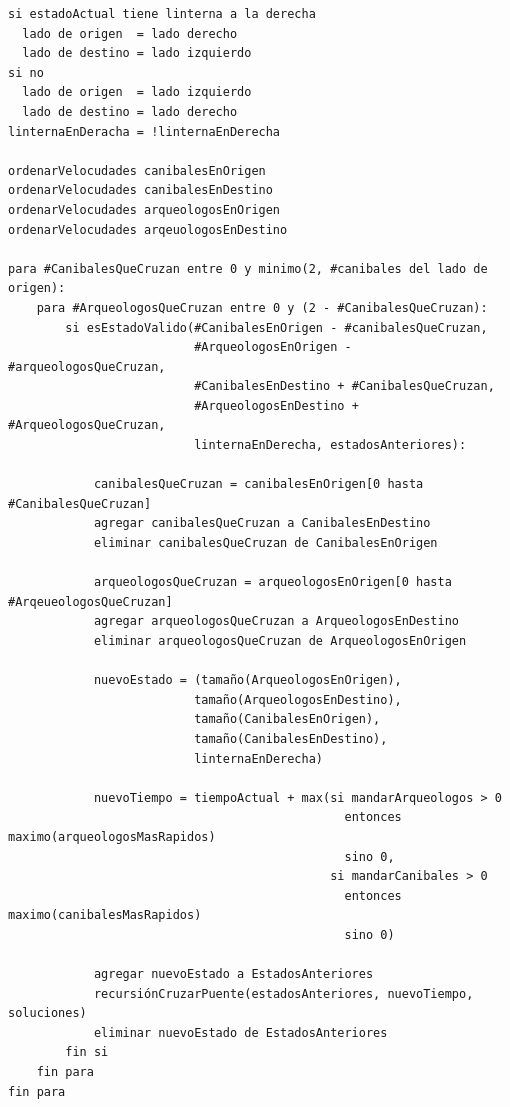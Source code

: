         \begin{codesnippet}
        \begin{verbatim}
si estadoActual tiene linterna a la derecha
  lado de origen  = lado derecho
  lado de destino = lado izquierdo
si no
  lado de origen  = lado izquierdo
  lado de destino = lado derecho
linternaEnDeracha = !linternaEnDerecha

ordenarVelocudades canibalesEnOrigen
ordenarVelocudades canibalesEnDestino
ordenarVelocudades arqueologosEnOrigen
ordenarVelocudades arqeuologosEnDestino

para #CanibalesQueCruzan entre 0 y minimo(2, #canibales del lado de origen):
    para #ArqueologosQueCruzan entre 0 y (2 - #CanibalesQueCruzan):
        si esEstadoValido(#CanibalesEnOrigen - #canibalesQueCruzan,
                          #ArqueologosEnOrigen - #arqueologosQueCruzan,
                          #CanibalesEnDestino + #CanibalesQueCruzan,
                          #ArqueologosEnDestino + #ArqueologosQueCruzan,
                          linternaEnDerecha, estadosAnteriores):

            canibalesQueCruzan = canibalesEnOrigen[0 hasta #CanibalesQueCruzan]
            agregar canibalesQueCruzan a CanibalesEnDestino
            eliminar canibalesQueCruzan de CanibalesEnOrigen

            arqueologosQueCruzan = arqueologosEnOrigen[0 hasta #ArqeueologosQueCruzan]
            agregar arqueologosQueCruzan a ArqueologosEnDestino
            eliminar arqueologosQueCruzan de ArqueologosEnOrigen

            nuevoEstado = (tamaño(ArqueologosEnOrigen),
                          tamaño(ArqueologosEnDestino),
                          tamaño(CanibalesEnOrigen),
                          tamaño(CanibalesEnDestino),
                          linternaEnDerecha)

            nuevoTiempo = tiempoActual + max(si mandarArqueologos > 0
                                               entonces maximo(arqueologosMasRapidos)
                                               sino 0,
                                             si mandarCanibales > 0
                                               entonces maximo(canibalesMasRapidos)
                                               sino 0)

            agregar nuevoEstado a EstadosAnteriores
            recursiónCruzarPuente(estadosAnteriores, nuevoTiempo, soluciones)
            eliminar nuevoEstado de EstadosAnteriores
        fin si
    fin para
fin para
        \end{verbatim}
        \end{codesnippet}

